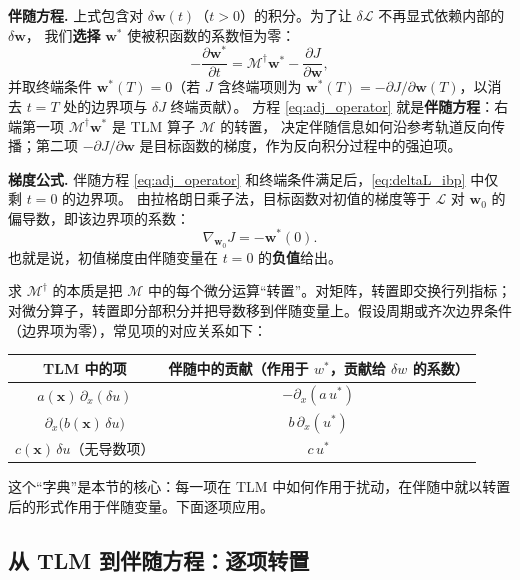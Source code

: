 \documentclass[12pt,a4paper,twoside]{article}
\begin{document}
\textbf{伴随方程.}
上式包含对 $\delta\mathbf{w}(t)$（$t>0$）的积分。为了让 $\delta\mathcal{L}$ 不再显式依赖内部的 $\delta\mathbf{w}$，
我们\textbf{选择} $\mathbf{w}^*$ 使被积函数的系数恒为零：
\begin{equation}
    -\frac{\partial \mathbf{w}^*}{\partial t}
    = \mathcal{M}^\dagger \mathbf{w}^*
    - \frac{\partial J}{\partial \mathbf{w}},
    \label{eq:adj_operator}
\end{equation}
并取终端条件 $\mathbf{w}^*(T)=0$（若 $J$ 含终端项则为 $\mathbf{w}^*(T)=-\partial J/\partial\mathbf{w}(T)$，以消去 $t=T$ 处的边界项与 $\delta J$ 终端贡献）。
方程 \eqref{eq:adj_operator} 就是\textbf{伴随方程}：右端第一项 $\mathcal{M}^\dagger\mathbf{w}^*$ 是 TLM 算子 $\mathcal{M}$ 的转置，
决定伴随信息如何沿参考轨道反向传播；第二项 $-\partial J/\partial\mathbf{w}$ 是目标函数的梯度，作为反向积分过程中的强迫项。

\textbf{梯度公式.}
伴随方程 \eqref{eq:adj_operator} 和终端条件满足后，\eqref{eq:deltaL_ibp} 中仅剩 $t=0$ 的边界项。
由拉格朗日乘子法，目标函数对初值的梯度等于 $\mathcal{L}$ 对 $\mathbf{w}_0$ 的偏导数，即该边界项的系数：
\[
    \boxed{\nabla_{\mathbf{w}_0}J = -\mathbf{w}^*(0)}.
\]
也就是说，初值梯度由伴随变量在 $t=0$ 的\textbf{负值}给出。

求 $\mathcal{M}^\dagger$ 的本质是把 $\mathcal{M}$ 中的每个微分运算“转置”。对矩阵，转置即交换行列指标；对微分算子，转置即分部积分并把导数移到伴随变量上。假设周期或齐次边界条件（边界项为零），常见项的对应关系如下：

\begin{center}
\begin{tabular}{c|c}
\hline
TLM 中的项 & 伴随中的贡献（作用于 $w^*$，贡献给 $\delta w$ 的系数） \\ \hline
$a(\mathbf{x})\,\partial_x(\delta u)$ & $-\partial_x(a\,u^*)$ \\
$\partial_x\big(b(\mathbf{x})\,\delta u\big)$ & $b\,\partial_x(u^*)$ \\
$c(\mathbf{x})\,\delta u$（无导数项） & $c\,u^*$ \\
\hline
\end{tabular}
\end{center}

这个“字典”是本节的核心：每一项在 TLM 中如何作用于扰动，在伴随中就以转置后的形式作用于伴随变量。下面逐项应用。

\subsection{从 TLM 到伴随方程：逐项转置}
\end{document}
